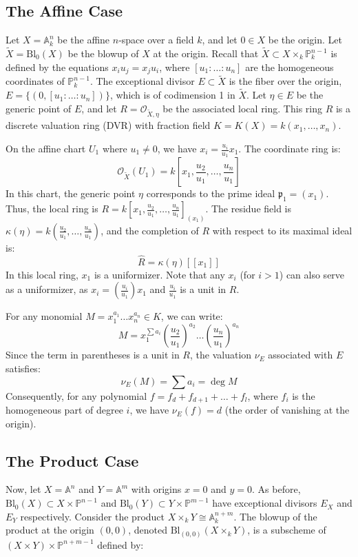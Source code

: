\subsection*{The Affine Case}
Let $X = \mathbb{A}_k^n$ be the affine $n$-space over a field $k$, and let $0 \in X$ be the origin. 
Let $\tilde{X} = \text{Bl}_0(X)$ be the blowup of $X$ at the origin. 
Recall that $\tilde{X} \subset X \times_k \mathbb{P}^{n-1}_k$ is defined by the equations $x_i u_j = x_j u_i$, where $[u_1 : \dots : u_n]$ are the homogeneous coordinates of 
$\mathbb{P}^{n-1}_k$.
The exceptional divisor $E \subset \tilde{X}$ is the fiber over the origin, $E = \{ (0, [u_1 : \dots : u_n]) \}$, which is of codimension 1 in $\tilde{X}$. 
Let $\eta \in E$ be the generic point of $E$, and let $R = \mathcal{O}_{\tilde{X}, \eta}$ be the associated local ring. 
This ring $R$ is a discrete valuation ring (DVR) with fraction field $K = K(X) = k(x_1, \dots, x_n)$.

On the affine chart $U_1$ where $u_1 \neq 0$, we have $x_i = \frac{u_i}{u_1} x_1$. 
The coordinate ring is:$$\mathcal{O}_{\tilde{X}}(U_1) = k\left[x_1, \frac{u_2}{u_1}, \dots, \frac{u_n}{u_1}\right]$$
In this chart, the generic point $\eta$ corresponds to the prime ideal $\mathfrak{p}_1 = (x_1)$. Thus, the local ring is $R = k[x_1, \frac{u_2}{u_1}, \dots, \frac{u_n}{u_1}]_{(x_1)}$. 
The residue field is $\kappa(\eta) = k(\frac{u_2}{u_1}, \dots, \frac{u_n}{u_1})$, and the completion of $R$ with respect to its maximal ideal is:
$$\hat{R} = \kappa(\eta)[[x_1]]$$
In this local ring, $x_1$ is a uniformizer. Note that any $x_i$ (for $i > 1$) can also serve as a uniformizer, 
as $x_i = (\frac{u_i}{u_1}) x_1$ and $\frac{u_i}{u_1}$ is a unit in $R$.

For any monomial $M = x_1^{a_1} \dots x_n^{a_n} \in K$, we can write:
$$M = x_1^{\sum a_i} \left( \frac{u_2}{u_1} \right)^{a_2} \dots \left( \frac{u_n}{u_1} \right)^{a_n}$$
Since the term in parentheses is a unit in $R$, the valuation $\nu_E$ associated with $E$ satisfies:
$$\nu_E(M) = \sum a_i = \deg M$$
Consequently, for any polynomial $f = f_d + f_{d+1} + \dots + f_l$, where $f_i$ is the homogeneous part of degree $i$, we have $\nu_E(f) = d$ (the order of vanishing at the origin).

\subsection*{The Product Case}
Now, let $X = \mathbb{A}^n$ and $Y = \mathbb{A}^m$ with origins $x=0$ and $y=0$. 
As before, $\text{Bl}_0(X) \subset X \times \mathbb{P}^{n-1}$ and $\text{Bl}_0(Y) \subset Y \times \mathbb{P}^{m-1}$ have exceptional divisors $E_X$ and $E_Y$ respectively.
Consider the product $X \times_k Y \cong \mathbb{A}_k^{n+m}$. 
The blowup of the product at the origin $(0,0)$, denoted $\text{Bl}_{(0,0)}(X \times_k Y)$, is a subscheme of $(X \times Y) \times \mathbb{P}^{n+m-1}$ defined by:

